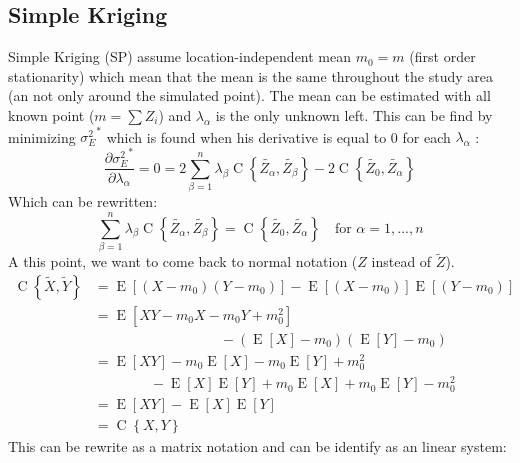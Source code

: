 \documentclass[twocolumn]{article}
\numberwithin{equation}{section}
\begin{document}
\subsection{Simple Kriging}
Simple Kriging (SP) assume location-independent mean $m_0 =m$ (first order stationarity) which mean that the mean is the same throughout the study area (an not only around the simulated point). The mean can be estimated with all known point ($m=\sum Z_i$) and $\lambda_\alpha$ is the only unknown left. This can be find by minimizing ${\sigma^2_E}^*$ which is found when his derivative is equal to 0 for each $\lambda_\alpha$ :
\begin{equation}
	\frac{\partial {\sigma^2_E}^*}{\partial \lambda_\alpha } = 0=2 \sum_{\beta=1}^n \lambda_\beta \operatorname{C}\left\{\tilde{Z_\alpha},\tilde{Z_\beta}\right\}
	-2 \operatorname{C}\left\{\tilde{Z_0}, \tilde{Z_\alpha}\right\}
\end{equation}
Which can be rewritten:
\begin{equation} \label{eq:minimvar}
	\sum_{\beta=1}^n \lambda_\beta \operatorname{C}\left\{\tilde{Z_\alpha},\tilde{Z_\beta}\right\} = \operatorname{C}\left\{\tilde{Z_0}, \tilde{Z_\alpha}\right\}  \quad \text{for } \alpha=1,...,n
\end{equation}
A this point, we want to come back to normal notation ($Z$ instead of $\tilde{Z}$). 
\begin{align*}
		\operatorname{C}\left\{ \tilde{X},\tilde{Y}\right\} 	&= \operatorname{E}[ (X-m_0)(Y-m_0) ] - \operatorname{E}[(X-m_0)] \operatorname{E}[(Y-m_0)]\\
															&= \operatorname{E}[ XY -m_0X -m_0Y+m_0^2]  \\
															&\quad \quad \quad \quad \quad \quad \quad \quad \quad - ( \operatorname{E}[X] - m_0 )( \operatorname{E}[Y] - m_0 )\\
															&= \operatorname{E}[XY] - m_0\operatorname{E}[X] -m_0 \operatorname{E}[Y] + m_0^2 \\
															&\quad \quad \quad \quad -  \operatorname{E}[X] \operatorname{E}[Y] +m_0 \operatorname{E}[X] + m_0 \operatorname{E}[Y] -m_0^2\\
															&= \operatorname{E}[XY] -  \operatorname{E}[X] \operatorname{E}[Y]\\
															&= \operatorname{C}\left\{ X,Y \right\}
\end{align*}
This can be rewrite as a matrix notation and can be identify as an linear system:
\end{document}
